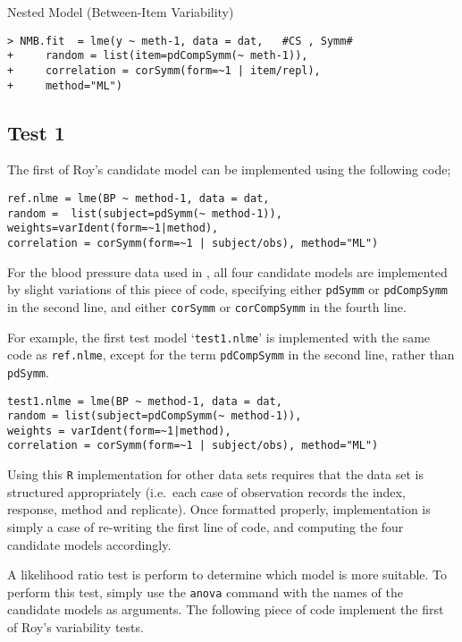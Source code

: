 Nested Model (Between-Item Variability)
\begin{framed}
\begin{verbatim}
> NMB.fit  = lme(y ~ meth-1, data = dat,   #CS , Symm#
+     random = list(item=pdCompSymm(~ meth-1)),
+     correlation = corSymm(form=~1 | item/repl), 
+     method="ML")
\end{verbatim}
\end{framed}
\subsection{Test 1}
The first of Roy's candidate model can be implemented using the following code;\\

\begin{framed}
\begin{verbatim}
ref.nlme = lme(BP ~ method-1, data = dat,
random =  list(subject=pdSymm(~ method-1)),
weights=varIdent(form=~1|method),
correlation = corSymm(form=~1 | subject/obs), method="ML")
\end{verbatim}
\end{framed}
For the blood pressure data used in \citet{ARoy2009}, all four candidate models are implemented by slight variations of this piece of code, specifying either \texttt{pdSymm} or \texttt{pdCompSymm} in the second line, and either \texttt{corSymm} or \texttt{corCompSymm} in the fourth line.

For example, the first test model `\texttt{test1.nlme}' is implemented with the same code as \texttt{ref.nlme}, except for the term \texttt{pdCompSymm} in the second line, rather than \texttt{pdSymm}.
\begin{framed}
\begin{verbatim}
test1.nlme = lme(BP ~ method-1, data = dat,
random = list(subject=pdCompSymm(~ method-1)),
weights = varIdent(form=~1|method),
correlation = corSymm(form=~1 | subject/obs), method="ML")
\end{verbatim}
\end{framed}

Using this \texttt{R} implementation for other data sets requires that the data set is structured appropriately (i.e.\ each case of observation records the index, response, method and replicate). Once formatted properly, implementation is simply a case of re-writing the first line of code, and computing the four candidate models accordingly.

A likelihood ratio test is perform to determine which model is more suitable. To perform this test, simply use the \texttt{anova} command with the names of the candidate models as arguments. The following piece of code implement the first of Roy's variability tests.

